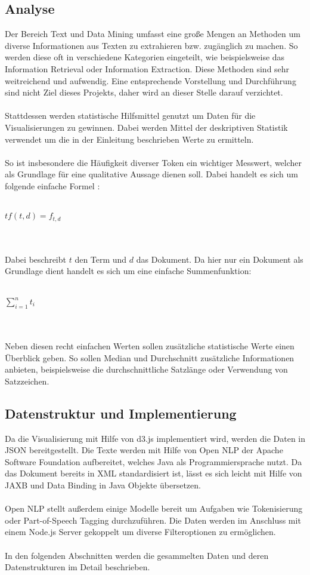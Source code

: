 \subsection{Analyse}
Der Bereich Text und Data Mining umfasst eine große Mengen an Methoden um diverse Informationen aus Texten zu extrahieren bzw. zug\"anglich zu machen. So werden diese oft in verschiedene Kategorien eingeteilt, wie beispielsweise das Information Retrieval oder Information Extraction. Diese Methoden sind sehr weitreichend und aufwendig. Eine entsprechende Vorstellung und Durchf\"uhrung sind nicht Ziel dieses Projekts, daher wird an dieser Stelle darauf verzichtet.\\
\\
Stattdessen werden statistische Hilfsmittel genutzt um Daten f\"ur die Visualisierungen zu gewinnen. Dabei werden Mittel der deskriptiven Statistik verwendet um die in der Einleitung beschrieben Werte zu ermitteln.\\
\\
So ist insbesondere die Häufigkeit diverser Token ein wichtiger Messwert, welcher als Grundlage f\"ur eine qualitative Aussage dienen soll. Dabei handelt es sich um folgende einfache Formel \cite{Weiss}:\\
\\
\centerline{$ tf(t,d) = f_{t,d} $}\\
\\
Dabei beschreibt $t$ den Term und $d$ das Dokument. Da hier nur ein Dokument als Grundlage dient handelt es sich um eine einfache Summenfunktion:\\
\\
\centerline{$\sum_{i=1}^{n} t_i$}\\
\\
Neben diesen recht einfachen Werten sollen zus\"atzliche statistische Werte einen \"Uberblick geben. So sollen Median und Durchschnitt zus\"atzliche Informationen anbieten, beispielsweise die durchschnittliche Satzl\"ange oder Verwendung von Satzzeichen.

\subsection{Datenstruktur und Implementierung}
Da die Visualisierung mit Hilfe von d3.js implementiert wird, werden die Daten in JSON bereitgestellt. Die Texte werden mit Hilfe von Open NLP der Apache Software Foundation aufbereitet, welches Java als Programmiersprache nutzt. Da das Dokument bereits in XML standardisiert ist, l\"asst es sich leicht mit Hilfe von JAXB und Data Binding in Java Objekte \"ubersetzen. \\
\\
Open NLP stellt außerdem einige Modelle bereit um Aufgaben wie Tokenisierung oder Part-of-Speech Tagging durchzuf\"uhren. Die Daten werden im Anschluss mit einem Node.js Server gekoppelt um diverse Filteroptionen zu erm\"oglichen.\\
\\
In den folgenden Abschnitten werden die gesammelten Daten und deren Datenstrukturen im Detail beschrieben.

